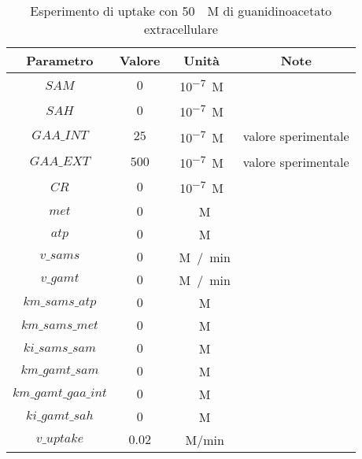 \begin{table}[H]
	\centering
	\begin{tabular}{| c | c | c | c |}
	\hline
	Parametro & Valore & Unit\`a & Note \\
		\hline
		$SAM$ & $0$ & \si{10^{-7} M} & \\
		\hline
		$SAH$ & $0$ & \si{10^{-7} M} & \\
		\hline
		$GAA\_INT$ & $25$ & \si{10^{-7} M} & valore sperimentale \\
		\hline
		$GAA\_EXT$ & $500$ & \si{10^{-7} M} & valore sperimentale \\
		\hline
		$CR$ & $0$ & \si{10^{-7} M} & \\
		\hline
		$met$ & $0$ & \si{\mu M} & \\
		\hline
		$atp$ & $0$ & \si{\mu M} & \\
		\hline
		$v\_sams$ & $0$ & \si{\mu M / min} & \\
		\hline
		$v\_gamt$ & $0$ & \si{\mu M / min} & \\
		\hline
		$km\_sams\_atp$ & $0$ & \si{\mu M} & \\
		\hline
		$km\_sams\_met$ & $0$ & \si{\mu M} & \\
		\hline
		$ki\_sams\_sam$ & $0$ & \si{\mu M} & \\
		\hline
		$km\_gamt\_sam$ & $0$ & \si{\mu M} & \\
		\hline
		$km\_gamt\_gaa\_int$ & $0$ & \si{\mu M} & \\
		\hline
		$ki\_gamt\_sah$ & $0$ & \si{\mu M} & \\
		\hline
		$v\_uptake$ & $0.02$ & \si{\mu M/min} & \\
		\hline
	\end{tabular}
	\caption{Esperimento di uptake con \SI{50}{\mu M} di guanidinoacetato extracellulare}
	\label{mod:3}
\end{table}

